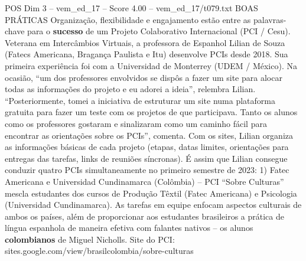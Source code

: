\begin{textsample}{POS Dim 3 – vem\_ed\_17 – Score 4.00 – vem\_ed\_17/t079.txt}  \label{ex:f3_pos_176}
BOAS PRÁTICAS Organização, flexibilidade e engajamento estão entre as palavras-chave para o \textbf{sucesso} de um Projeto Colaborativo Internacional (PCI / Cesu).
Veterana em Intercâmbios Virtuais, a professora de Espanhol Lilian de Souza (Fatecs Americana, Bragança Paulista e Itu) desenvolve PCIs desde 2018.
Sua primeira experiência foi com a Universidad de Monterrey (UDEM / México).
Na ocasião, “um dos professores envolvidos se dispôs a fazer um site para alocar todas as informações do projeto e eu adorei a ideia”, relembra Lilian. “Posteriormente, tomei a iniciativa de estruturar um site numa plataforma gratuita para fazer um teste com os projetos de que participava.
Tanto os alunos como os professores gostaram e sinalizaram como um caminho fácil para encontrar as orientações sobre os PCIs”, comenta.
Com os sites, Lilian organiza as informações básicas de cada projeto (etapas, datas limites, orientações para entregas das tarefas, links de reuniões síncronas).
É assim que Lilian consegue conduzir quatro PCIs simultaneamente no primeiro semestre de 2023: 1) Fatec Americana e Universidad Cundinamarca (Colômbia) – PCI “Sobre Culturas” mescla estudantes dos cursos de Produção Têxtil (Fatec Americana) e Psicologia (Universidad Cundinamarca).
As tarefas em equipe enfocam aspectos culturais de ambos os países, além de proporcionar aos estudantes brasileiros a prática de língua espanhola de maneira efetiva com falantes nativos – os alunos \textbf{colombianos} de Miguel Nicholls.
Site do PCI: sites.google.com/view/brasilcolombia/sobre-culturas

\end{textsample}
